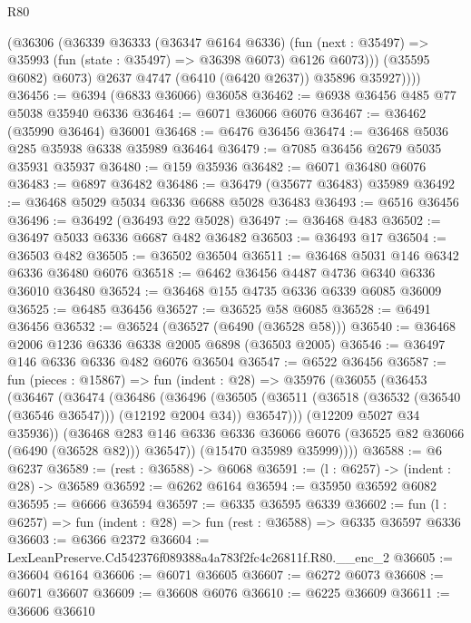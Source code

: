 \begin{lexlean}{R80}
\begin{coremodule}
              (@36306
                (@36339
                  @36333
                  (@36347 @6164 @6336)
                  (fun (next : @35497) =>
                  @35993 (fun (state : @35497) => @36398 @6073) @6126 @6073)))
              (@35595 @6082)
              @6073)
            @2637
            @4747
            (@6410 (@6420 @2637))
            @35896
            @35927))))
@36456 := @6394 (@6833 @36066) @36058
@36462 := @6938 @36456 @485 @77 @5038 @35940 @6336
@36464 := @6071 @36066 @6076
@36467 := @36462 (@35990 @36464) @36001
@36468 := @6476 @36456
@36474 := @36468 @5036 @285 @35938 @6338 @35989 @36464
@36479 := @7085 @36456 @2679 @5035 @35931 @35937
@36480 := @159 @35936
@36482 := @6071 @36480 @6076
@36483 := @6897 @36482
@36486 := @36479 (@35677 @36483) @35989
@36492 := @36468 @5029 @5034 @6336 @6688 @5028 @36483
@36493 := @6516 @36456
@36496 := @36492 (@36493 @22 @5028)
@36497 := @36468 @483
@36502 := @36497 @5033 @6336 @6687 @482 @36482
@36503 := @36493 @17
@36504 := @36503 @482
@36505 := @36502 @36504
@36511 := @36468 @5031 @146 @6342 @6336 @36480 @6076
@36518 := @6462 @36456 @4487 @4736 @6340 @6336 @36010 @36480
@36524 := @36468 @155 @4735 @6336 @6339 @6085 @36009
@36525 := @6485 @36456
@36527 := @36525 @58 @6085
@36528 := @6491 @36456
@36532 := @36524 (@36527 (@6490 (@36528 @58)))
@36540 := @36468 @2006 @1236 @6336 @6338 @2005 @6898 (@36503 @2005)
@36546 := @36497 @146 @6336 @6336 @482 @6076 @36504
@36547 := @6522 @36456
@36587 := fun (pieces : @15867) =>
  fun (indent : @28) =>
  @35976
    (@36055
      (@36453
        (@36467
          (@36474
            (@36486
              (@36496
                (@36505
                  (@36511 (@36518 (@36532 (@36540 (@36546 @36547))) (@12192 @2004 @34)) @36547)))
              (@12209 @5027 @34 @35936))
            (@36468
              @283
              @146
              @6336
              @6336
              @36066
              @6076
              (@36525 @82 @36066 (@6490 (@36528 @82)))
              @36547))
          (@15470 @35989 @35999))))
@36588 := @6 @6237
@36589 := (rest : @36588) -> @6068
@36591 := (l : @6257) -> (indent : @28) -> @36589
@36592 := @6262 @6164
@36594 := @35950 @36592 @6082
@36595 := @6666 @36594
@36597 := @6335 @36595 @6339
@36602 := fun (l : @6257) => fun (indent : @28) => fun (rest : @36588) => @6335 @36597 @6336
@36603 := @6366 @2372
@36604 := LexLeanPreserve.Cd542376f089388a4a783f2fc4c26811f.R80.__enc_2
@36605 := @36604 @6164
@36606 := @6071 @36605
@36607 := @6272 @6073
@36608 := @6071 @36607
@36609 := @36608 @6076
@36610 := @6225 @36609
@36611 := @36606 @36610

\end{coremodule}
\end{lexlean}
